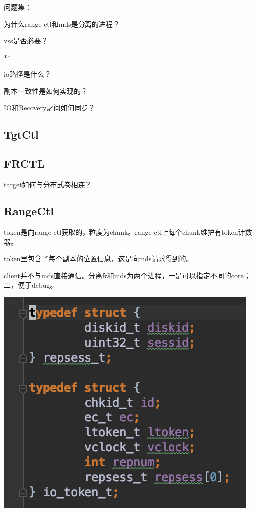 问题集：
\begin{enumbox}
\item 为什么range ctl和mds是分离的进程？
\item vss是否必要？
\item ***
\item io路径是什么？
\item 副本一致性是如何实现的？
\item IO和Recovery之间如何同步？
\end{enumbox}

\subsection{TgtCtl}

\subsection{FRCTL}

target如何与分布式卷相连？

\subsection{RangeCtl}

token是向range ctl获取的，粒度为chunk。range ctl上每个chunk维护有token计数器。

token里包含了每个副本的位置信息，这是向mds请求得到的。

client并不与mds直接通信。分离fr和mds为两个进程，一是可以指定不同的core；二，便于debug。

\begin{center}
\includegraphics{../imgs/token.png}
\end{center}


